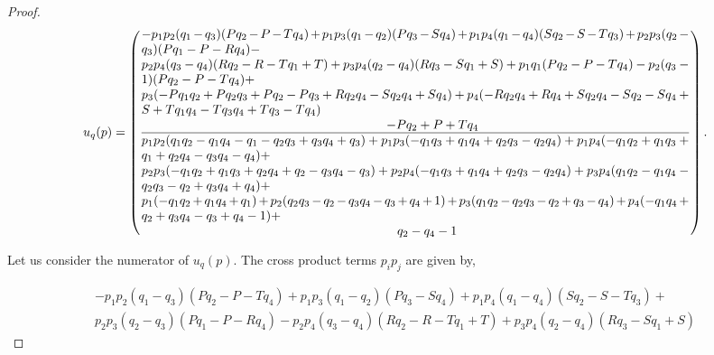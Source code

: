 \documentclass[10pt]{article}
\begin{document}
\begin{proof}
    \begingroup
    \scriptsize
    \begin{equation*}
        u_q(p) =
        \left(
          \frac
            {\parbox{6in}{$ - p_{1} p_{2} (q_{1} - q_{3}) (P q_{2} - P - T q_{4}) + p_{1} p_{3} (q_{1} - q_{2}) (P q_{3} - S q_{4}) + p_{1} p_{4} (q_{1} - q_{4}) (S q_{2} - S - T q_{3}) + p_{2} p_{3} (q_{2} - q_{3}) (P q_{1} - P - R q_{4}) - $ \\
            $ p_{2} p_{4} (q_{3} - q_{4}) (R q_{2} - R - T q_{1} + T) + p_{3} p_{4} (q_{2} - q_{4}) (R q_{3} - S q_{1} + S) + p_{1} q_{1} (P q_{2} - P - T q_{4}) - p_{2} (q_{3} - 1) (P q_{2} - P - T q_{4}) + $ \\
            $ p_{3} (- P q_{1} q_{2} + P q_{2} q_{3} + P q_{2} - P q_{3} + R q_{2} q_{4} - S q_{2} q_{4} + S q_{4}) + p_{4} (- R q_{2} q_{4} + R q_{4} + S q_{2} q_{4} - S q_{2} - S q_{4} + S + T q_{1} q_{4} - T q_{3} q_{4} + T q_{3} - T q_{4}) $ \\
            \hspace*{6.7cm} $- P q_{2} + P + T q_{4}$
            }}
            {\parbox{6in}{$
            p_{1} p_{2} (q_{1} q_{2} - q_{1} q_{4} - q_{1} - q_{2} q_{3} + q_{3} q_{4} + q_{3}) + p_{1} p_{3} (- q_{1} q_{3} + q_{1} q_{4} + q_{2} q_{3} - q_{2} q_{4}) + p_{1} p_{4} (- q_{1} q_{2} + q_{1} q_{3} + q_{1} + q_{2} q_{4} - q_{3} q_{4} - q_{4}) +$ \\
            $ p_{2} p_{3} (- q_{1} q_{2} + q_{1} q_{3} + q_{2} q_{4} + q_{2} - q_{3} q_{4} - q_{3}) + p_{2} p_{4} (- q_{1} q_{3} + q_{1} q_{4} + q_{2} q_{3} - q_{2} q_{4}) + p_{3} p_{4} (q_{1} q_{2} - q_{1} q_{4} - q_{2} q_{3} - q_{2} + q_{3} q_{4} + q_{4}) + $ \\
            $ p_{1} (- q_{1} q_{2} + q_{1} q_{4} + q_{1}) + p_{2} (q_{2} q_{3} - q_{2} - q_{3} q_{4} - q_{3} + q_{4} + 1) + p_{3} (q_{1} q_{2} - q_{2} q_{3} - q_{2} + q_{3} - q_{4}) + p_{4} (- q_{1} q_{4} + q_{2} + q_{3} q_{4} - q_{3} + q_{4} - 1) + $ \\
            \hspace*{7cm} $q_{2} - q_{4} - 1$
          }}
        \right).
    \end{equation*}
    \endgroup
    
    Let us consider the numerator of \(u_q(p)\). The cross product terms
    \(p_ip_j\) are given by,
    
    \begingroup
    \footnotesize
    \begin{align*}
    - p_{1} p_{2} (q_{1} - q_{3}) (P q_{2} - P - T q_{4}) + p_{1} p_{3} (q_{1} - q_{2}) (P q_{3} - S q_{4}) + p_{1} p_{4} (q_{1} - q_{4}) (S q_{2} - S - T q_{3}) + \\
    p_{2} p_{3} (q_{2} - q_{3}) (P q_{1} - P - R q_{4}) - p_{2} p_{4} (q_{3} - q_{4}) (R q_{2} - R - T q_{1} + T) + p_{3} p_{4} (q_{2} - q_{4}) (R q_{3} - S q_{1} + S)
    \end{align*}
    \endgroup
    

\end{proof}
\end{document}
